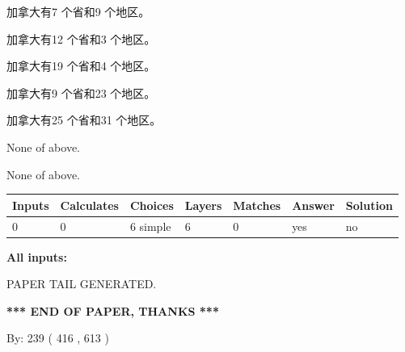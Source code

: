 \documentclass{ctexart}
\begin{document}
 
加拿大有7 个省和9 个地区。
 
 
加拿大有12 个省和3 个地区。
 
 
加拿大有19 个省和4 个地区。
 
 
加拿大有9 个省和23 个地区。
 
 
加拿大有25 个省和31 个地区。
 
 
 None of above.
 
 
\noindent{}
 
 
 None of above.
 
 
\noindent{}
 
 
   
   
   
   
\noindent\begin{tabular}{|l|l|l|l|l|l|l|}
 \hline
Inputs & Calculates & Choices & Layers & Matches & Answer & Solution \\ \hline
 0  & 
 0  & 
 6
  simple  
  & 
 6  & 
 0  & 
  yes & 
  no 
  \\ \hline
 \end{tabular}
   
   
   
   
\noindent{}
   
   
   
   
\noindent\vspace{0.1in}\hspace{-0.08in} {\textbf{\Large{All inputs: }}}
   
   
   
   
   
   
 \vspace{0.2in}
 
   
   
\vspace{2.0in} PAPER TAIL GENERATED.
   
   
   
   
\vspace{1.0in} 
{\textbf{\large{ *** END OF PAPER, THANKS *** }}} 
   
   
\hspace{1.0in} By: 
 239 ( 416 ,  613 )
   
\end{document}
